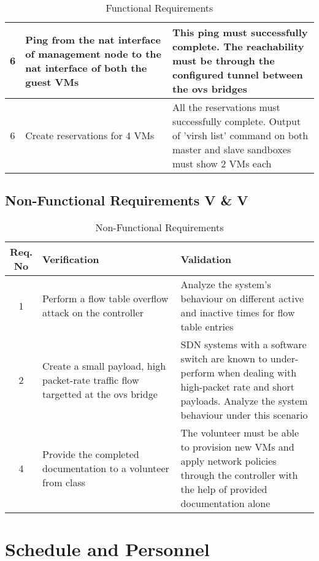 \documentclass[12pt]{extarticle}
\begin{document}
\begin{center}
\begin{table}[H]
\begin{tabular}{||c  | p{0.5\linewidth} | p{0.5\linewidth} ||}
    \hline
    6 & Ping from the nat interface of management node to the nat interface of both the guest VMs & This ping must successfully complete. The reachability must be through the configured tunnel between the ovs bridges \\
    \hline
    6 & Create reservations for 4 VMs & All the reservations must successfully complete. Output of 'virsh list' command on both master and slave sandboxes must show 2 VMs each \\
    \hline
\end{tabular}
\caption{Functional Requirements}
\label{table:func_vv}
\end{table}
\end{center}

\begin{center}
\begin{table}[H]
\subsection{Non-Functional Requirements V \& V}
\begin{tabular}{||c  | p{0.5\linewidth} | p{0.5\linewidth} ||}
     \hline
     Req. No & Verification & Validation  \\ 
     \hline \hline
     1 & Perform a flow table overflow attack on the controller & Analyze the system's behaviour on different active and inactive times for flow table entries \\
     \hline
     2 & Create a small payload, high packet-rate traffic flow targetted at the ovs bridge & SDN systems with a software switch are known to under-perform when dealing with high-packet rate and short payloads. Analyze the system behaviour under this scenario \\
     \hline
     4 & Provide the completed documentation to a volunteer from class & The volunteer must be able to provision new VMs and apply network policies through the controller with the help of provided documentation alone \\     
    \hline
\end{tabular}
\caption{Non-Functional Requirements}
\label{table:nonfunc_vv}
\end{table}
\end{center}

\section{Schedule and Personnel}
\end{document}
